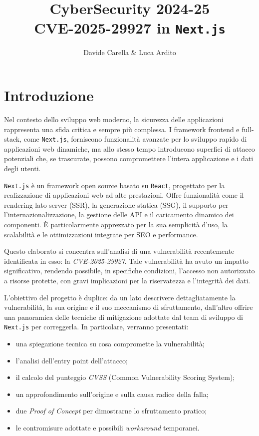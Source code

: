 \documentclass[a4paper,oneside,12pt]{report}
\title{\textbf{CyberSecurity 2024-25} \\ CVE-2025-29927 in \texttt{Next.js}}
\author{Davide Carella \& Luca Ardito}
\date{}
\begin{document}
\maketitle
\tableofcontents
\newpage

\chapter*{Introduzione}
\label{chap:introduzione}

Nel contesto dello sviluppo web moderno, la sicurezza delle applicazioni rappresenta una sfida critica e sempre più complessa. I framework frontend e full-stack, come \texttt{Next.js}, forniscono funzionalità avanzate per lo sviluppo rapido di applicazioni web dinamiche, ma allo stesso tempo introducono superfici di attacco potenziali che, se trascurate, possono compromettere l'intera applicazione e i dati degli utenti.

\texttt{Next.js} è un framework open source basato su \texttt{React}, progettato per la realizzazione di applicazioni web ad alte prestazioni. Offre funzionalità come il rendering lato server (SSR), la generazione statica (SSG), il supporto per l'internazionalizzazione, la gestione delle API e il caricamento dinamico dei componenti. È particolarmente apprezzato per la sua semplicità d’uso, la scalabilità e le ottimizzazioni integrate per SEO e performance.

Questo elaborato si concentra sull’analisi di una vulnerabilità recentemente identificata in esso: la \emph{CVE-2025-29927}. Tale vulnerabilità ha avuto un impatto significativo, rendendo possibile, in specifiche condizioni, l’accesso non autorizzato a risorse protette, con gravi implicazioni per la riservatezza e l'integrità dei dati.

L’obiettivo del progetto è duplice: da un lato descrivere dettagliatamente la vulnerabilità, la sua origine e il suo meccanismo di sfruttamento, dall’altro offrire una panoramica delle tecniche di mitigazione adottate dal team di sviluppo di \texttt{Next.js} per correggerla. In particolare, verranno presentati:
\begin{itemize}
  \item una spiegazione tecnica su cosa compromette la vulnerabilità;
  \item l’analisi dell’entry point dell’attacco;
  \item il calcolo del punteggio \emph{CVSS} (Common Vulnerability Scoring System);
  \item un approfondimento sull’origine e sulla causa radice della falla;
  \item due \textit{Proof of Concept} per dimostrarne lo sfruttamento pratico;
  \item le contromisure adottate e possibili \textit{workaround} temporanei.
\end{itemize}
\end{document}
